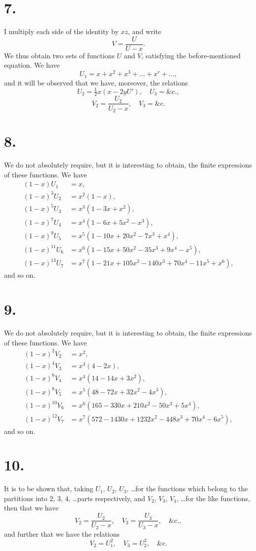 \documentclass[11pt,a4paper]{article}
\begin{document}
\section*{7.}
I multiply each side of the identity by $xz$, and write
\[
V = \frac{U}{U - x}.
\]
We thus obtain two sets of functions $U$ and $V$, satisfying the before-mentioned equation. We have
\[
U_1 = x + x^2 + x^3 + \ldots + x^r + \ldots,
\]
and it will be observed that we have, moreover, the relations
\[
U_2 = \tfrac{1}{2}x(x - 2yU'), \quad U_3 = \&\text{c.},
\]
\[
V_2 = \frac{U_2}{U_2 - x}, \quad V_3 = \&\text{c.}
\]

\section*{8.}
We do not absolutely require, but it is interesting to obtain, the finite expressions of these functions. We have
\begin{align*}
(1 - x)U_1 &= x, \\
(1 - x)^3U_2 &= x^2(1 - x), \\
(1 - x)^5U_3 &= x^3(1 - 3x + x^2), \\
(1 - x)^7U_4 &= x^4(1 - 6x + 5x^2 - x^3), \\
(1 - x)^9U_5 &= x^5(1 - 10x + 20x^2 - 7x^3 + x^4), \\
(1 - x)^{11}U_6 &= x^6(1 - 15x + 50x^2 - 35x^3 + 9x^4 - x^5), \\
(1 - x)^{13}U_7 &= x^7(1 - 21x + 105x^2 - 140x^3 + 70x^4 - 11x^5 + x^6),
\end{align*}
and so on.

\section*{9.}
We do not absolutely require, but it is interesting to obtain, the finite expressions of these functions. We have
\begin{align*}
(1 - x)^2V_2 &= x^2, \\
(1 - x)^4V_3 &= x^3(4 - 2x), \\
(1 - x)^6V_4 &= x^4(14 - 14x + 3x^2), \\
(1 - x)^8V_5 &= x^5(48 - 72x + 32x^2 - 4x^3), \\
(1 - x)^{10}V_6 &= x^6(165 - 330x + 210x^2 - 50x^3 + 5x^4), \\
(1 - x)^{12}V_7 &= x^7(572 - 1430x + 1232x^2 - 448x^3 + 70x^4 - 6x^5),
\end{align*}
and so on.

\section*{10.}
It is to be shown that, taking $U_1$, $U_2$, $U_3$, \ldots for the functions which belong to the partitions into $2$, $3$, $4$, \ldots parts respectively, and $V_2$, $V_3$, $V_4$, \ldots for the like functions, then that we have
\[
V_2 = \frac{U_2}{U_2 - x}, \quad V_3 = \frac{U_3}{U_3 - x}, \quad \&\text{c.},
\]
and further that we have the relations
\[
V_2 = U_1^2, \quad V_3 = U_2^2, \quad \&\text{c.}
\]
\end{document}
